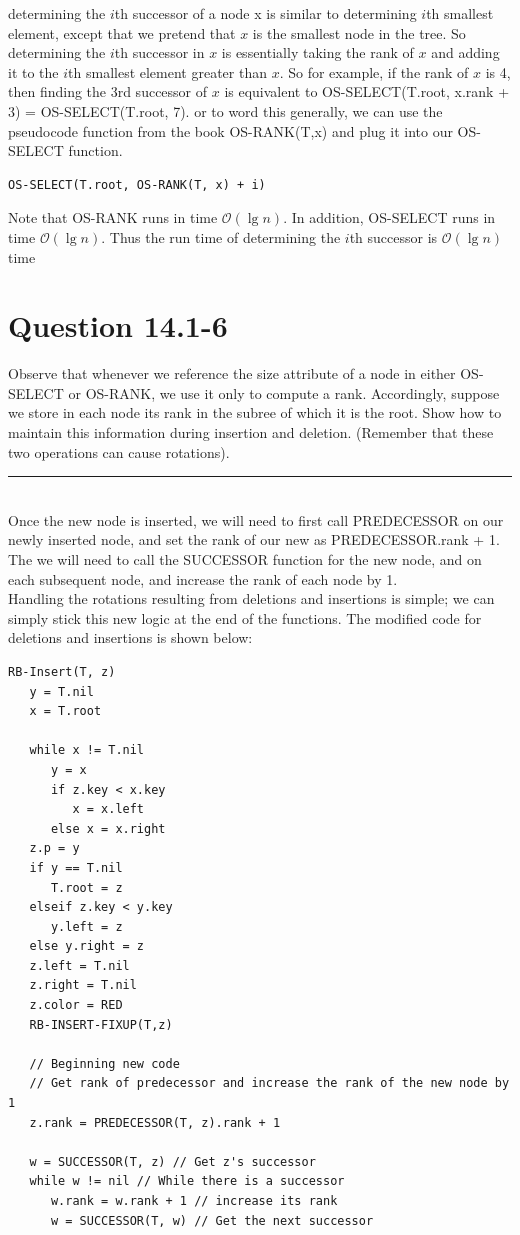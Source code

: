 \documentclass[20pt]{article} %
\begin{document}
determining the $i$th successor of a node x is similar to determining $i$th smallest element, except that we pretend that $x$ is the smallest node in the tree.  So determining the $i$th successor in $x$ is essentially taking the rank of $x$ and adding it to the $i$th smallest element greater than $x$.  So for example, if the rank of $x$ is 4, then finding the 3rd successor of $x$ is equivalent to OS-SELECT(T.root, x.rank + 3) = OS-SELECT(T.root, 7). or to word this generally, we can use the pseudocode function from the book OS-RANK(T,x) and plug it into our OS-SELECT function.
\begin{verbatim}
OS-SELECT(T.root, OS-RANK(T, x) + i)
\end{verbatim}

Note that OS-RANK runs in time $\mathcal{O}(\lg n)$. In addition, OS-SELECT runs in time  $\mathcal{O}(\lg n)$.  Thus the run time of determining the $i$th successor is $\mathcal{O}(\lg n)$ time

\newpage
\section{Question 14.1-6}
Observe that whenever we reference the size attribute of a node in either OS-SELECT or OS-RANK, we use it only to compute a rank.  Accordingly, suppose we store in each node its rank in the subree of which it is the root. Show how to maintain this information during insertion and deletion. (Remember that these two operations can cause rotations). \\
\noindent\rule{2cm}{0.4pt} \\

Once the new node is inserted, we will need to first call PREDECESSOR on our newly inserted node, and set the rank of our new as PREDECESSOR.rank + 1. The we will need to call the SUCCESSOR function for the new node, and on each subsequent node, and increase the rank of each node by 1. \\

Handling the rotations resulting from deletions and insertions is simple; we can simply stick this new logic at the end of the functions.  The modified code for deletions and insertions is shown below:

\begin{verbatim}
RB-Insert(T, z)
   y = T.nil
   x = T.root
	
   while x != T.nil
      y = x
      if z.key < x.key
         x = x.left
      else x = x.right
   z.p = y
   if y == T.nil
      T.root = z
   elseif z.key < y.key
      y.left = z
   else y.right = z
   z.left = T.nil
   z.right = T.nil
   z.color = RED
   RB-INSERT-FIXUP(T,z)

   // Beginning new code
   // Get rank of predecessor and increase the rank of the new node by 1
   z.rank = PREDECESSOR(T, z).rank + 1 

   w = SUCCESSOR(T, z) // Get z's successor
   while w != nil // While there is a successor
      w.rank = w.rank + 1 // increase its rank
      w = SUCCESSOR(T, w) // Get the next successor

\end{verbatim} \\
\end{document}
